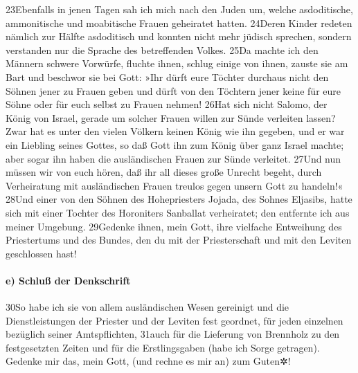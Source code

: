 23Ebenfalls in jenen Tagen sah ich mich nach den Juden um, welche
asdoditische, ammonitische und moabitische Frauen geheiratet hatten.
24Deren Kinder redeten nämlich zur Hälfte asdoditisch und konnten nicht
mehr jüdisch sprechen, sondern verstanden nur die Sprache des
betreffenden Volkes. 25Da machte ich den Männern schwere Vorwürfe,
fluchte ihnen, schlug einige von ihnen, zauste sie am Bart und beschwor
sie bei Gott: »Ihr dürft eure Töchter durchaus nicht den Söhnen jener zu
Frauen geben und dürft von den Töchtern jener keine für eure Söhne oder
für euch selbst zu Frauen nehmen! 26Hat sich nicht Salomo, der König von
Israel, gerade um solcher Frauen willen zur Sünde verleiten lassen? Zwar
hat es unter den vielen Völkern keinen König wie ihn gegeben, und er war
ein Liebling seines Gottes, so daß Gott ihn zum König über ganz Israel
machte; aber sogar ihn haben die ausländischen Frauen zur Sünde
verleitet. 27Und nun müssen wir von euch hören, daß ihr all dieses große
Unrecht begeht, durch Verheiratung mit ausländischen Frauen treulos
gegen unsern Gott zu handeln!« 28Und einer von den Söhnen des
Hohepriesters Jojada, des Sohnes Eljasibs, hatte sich mit einer Tochter
des Horoniters Sanballat verheiratet; den entfernte ich aus meiner
Umgebung. 29Gedenke ihnen, mein Gott, ihre vielfache Entweihung des
Priestertums und des Bundes, den du mit der Priesterschaft und mit den
Leviten geschlossen hast!

\hypertarget{e-schluuxdf-der-denkschrift}{%
\paragraph{e) Schluß der
Denkschrift}\label{e-schluuxdf-der-denkschrift}}

30So habe ich sie von allem ausländischen Wesen gereinigt und die
Dienstleistungen der Priester und der Leviten fest geordnet, für jeden
einzelnen bezüglich seiner Amtspflichten, 31auch für die Lieferung von
Brennholz zu den festgesetzten Zeiten und für die Erstlingsgaben (habe
ich Sorge getragen). Gedenke mir das, mein Gott, (und rechne es mir an)
zum Guten✲!
